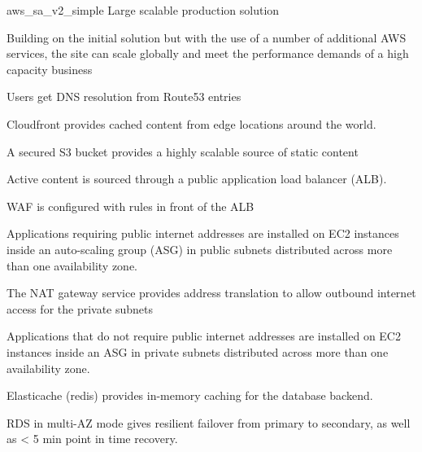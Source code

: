 
\architecture
{aws_sa_v2_simple}
{Large scalable production solution}

\changes
{Building on the initial solution but with the use of a number of additional AWS services, the site can scale globally and meet the performance demands of a high capacity business}
{
\item Users get DNS resolution from Route53 entries
\item Cloudfront provides cached content from edge locations around the world. 
\item A secured S3 bucket provides a highly scalable source of static content
\item Active content is sourced through a public application load balancer (ALB).
\item WAF is configured with rules in front of the ALB
\item Applications requiring public internet addresses are installed on EC2 instances inside an auto-scaling group (ASG) in public subnets distributed across more than one availability zone.
\item The NAT gateway service provides address translation to allow outbound internet access for the private subnets
\item Applications that do not require public internet addresses are installed on EC2 instances inside an ASG in private subnets distributed across more than one availability zone.
\item Elasticache (redis) provides in-memory caching for the database backend.
\item RDS in multi-AZ mode gives resilient failover from primary to secondary, as well as < 5 min point in time recovery.
}